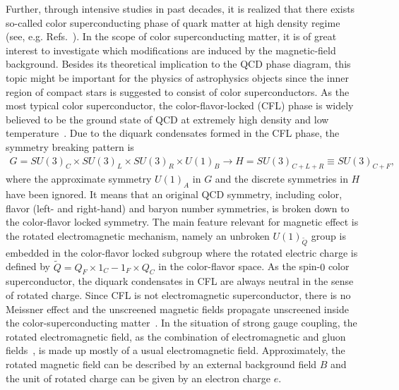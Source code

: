 \documentclass[12pt]{article}
\begin{document}
Further, through intensive studies in past decades, it is realized that there exists so-called color
superconducting phase of quark matter at high density regime (see, e.g.
Refs.~\cite{alford2004dense,buballa2005njl}). In the scope of color superconducting matter, it is of
great interest to investigate which modifications are induced by the magnetic-field background.
Besides its theoretical implication to the QCD phase diagram, this topic might be important for the physics of astrophysics objects since the inner region of compact stars is suggested to consist of color superconductors.
As the most typical color superconductor, the color-flavor-locked (CFL) phase is widely believed to be
the ground state of QCD at extremely high density and low temperature~\cite{alford1998qcd}. Due to the
diquark condensates formed in the CFL phase, the symmetry breaking pattern is
\begin{eqnarray}
G=SU(3)_{C}\times SU(3)_{L}
\times SU(3)_{R}\times U(1)_{B} \rightarrow H=SU(3)_{C+L+R}\equiv SU(3)_{C+F},\label{cfl}
\end{eqnarray}
where the approximate symmetry $U(1)_{A}$ in $G$ and the discrete symmetries in $H$ have been ignored.
It means that an original QCD symmetry, including color, flavor (left- and right-hand) and baryon number
symmetries, is broken down to the color-flavor locked symmetry.
The main feature relevant for magnetic effect is the rotated electromagnetic mechanism, namely an unbroken
$U(1)_{\widetilde{Q}}$ group is embedded in the color-flavor locked subgroup where the rotated electric
charge is defined by $\widetilde{Q}=Q_{F}\times {1}_{C}-{1}_{F}\times Q_{C}$ in the color-flavor space.
As the spin-$0$ color superconductor, the diquark condensates in CFL are always neutral in the sense of
rotated charge.
Since CFL is not electromagnetic superconductor, there is no Meissner effect and the unscreened magnetic
fields propagate unscreened inside the color-superconducting matter~\cite{alford1998qcd,alford2000magnetic}.
In the situation of strong gauge coupling, the rotated electromagnetic field, as the combination of
electromagnetic and gluon fields~\cite{alford1998qcd,alford2000magnetic}, is made up mostly of a usual
electromagnetic field. Approximately, the rotated magnetic field can be described by an external background field
$B$ and the unit of rotated charge can be given by an electron charge $e$.
\end{document}
